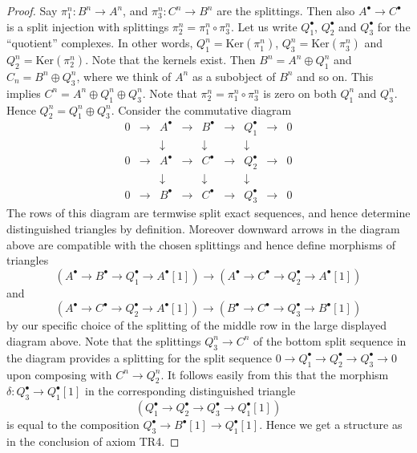 \begin{proof}
Say $\pi_1^n : B^n \to A^n$, and $\pi_3^n : C^n \to B^n$ are the splittings.
Then also $A^\bullet \to C^\bullet$ is a split injection with splittings
$\pi_2^n = \pi_1^n \circ \pi_3^n$. Let us write $Q_1^\bullet$, $Q_2^\bullet$
and $Q_3^\bullet$ for the ``quotient'' complexes. In other words,
$Q_1^n = \text{Ker}(\pi_1^n)$, $Q_3^n = \text{Ker}(\pi_3^n)$ and
$Q_2^n = \text{Ker}(\pi_2^n)$. Note that the kernels exist. Then
$B^n = A^n \oplus Q_1^n$ and $C_n = B^n \oplus Q_3^n$, where we think of $A^n$
as a subobject of $B^n$ and so on. This implies
$C^n = A^n \oplus Q_1^n \oplus Q_3^n$. Note that
$\pi_2^n = \pi_1^n \circ \pi_3^n$ is zero on both $Q_1^n$ and $Q_3^n$. Hence
$Q_2^n = Q_1^n \oplus Q_3^n$. Consider the commutative diagram
$$
\begin{matrix}
0 & \to & A^\bullet & \to & B^\bullet & \to & Q_1^\bullet & \to & 0 \\
  &     & \downarrow&     & \downarrow&     & \downarrow  & \\
0 & \to & A^\bullet & \to & C^\bullet & \to & Q_2^\bullet & \to & 0 \\
  &     & \downarrow&     & \downarrow&     & \downarrow  & \\
0 & \to & B^\bullet & \to & C^\bullet & \to & Q_3^\bullet & \to & 0
\end{matrix}
$$
The rows of this diagram are termwise split exact sequences, and
hence determine distinguished triangles by
definition. Moreover downward arrows in the diagram above
are compatible with the chosen splittings and hence
define morphisms of triangles
$$
(A^\bullet \to B^\bullet \to Q_1^\bullet \to A^\bullet[1])
\longrightarrow
(A^\bullet \to C^\bullet \to Q_2^\bullet \to A^\bullet[1])
$$
and
$$
(A^\bullet \to C^\bullet \to Q_2^\bullet \to A^\bullet[1])
\longrightarrow
(B^\bullet \to C^\bullet \to Q_3^\bullet \to B^\bullet[1])
$$
by our specific choice of the splitting of the middle row
in the large displayed diagram above.
Note that the splittings $Q_3^n \to C^n$
of the bottom split sequence in the diagram provides a splitting
for the split sequence
$0 \to Q_1^\bullet \to Q_2^\bullet \to Q_3^\bullet \to 0$
upon composing with $C^n \to Q_2^n$. It follows easily from this
that the morphism $\delta : Q_3^\bullet \to Q_1^\bullet[1]$
in the corresponding distinguished triangle
$$
(Q_1^\bullet \to Q_2^\bullet \to Q_3^\bullet \to Q_1^\bullet[1])
$$
is equal to the composition $Q_3^\bullet \to B^\bullet[1] \to Q_1^\bullet[1]$.
Hence we get a structure as in the conclusion of axiom TR4.
\end{proof}

